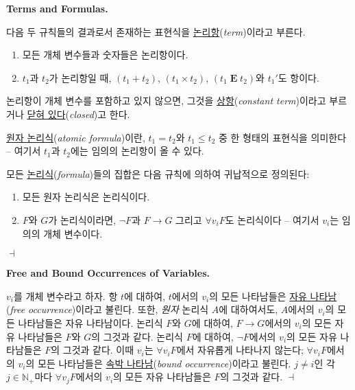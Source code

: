 \documentclass[12pt]{paper}
\newenvironment{context}[1][]
{ \noindent \textbf{{#1}.}
}
{ \hfill $ \dashv $
}
\begin{document}
  \begin{context}[Terms and Formulas]
    다음 두 규칙들의 결과로서 존재하는 표현식을 \underline{논리항}(\textit{term})이라고 부른다.
    \begin{enumerate}
      \item 모든 개체 변수들과 숫자들은 논리항이다.
      \item $t_{1}$과 $t_{2}$가 논리항일 때, $\left( t_{1} + t_{2} \right)$, $\left( t_{1} \times t_{2} \right)$, $\left( t_{1} \mathop{\mathbf{E}} t_{2} \right)$와 $t_{1} '$도 항이다.
    \end{enumerate}

    논리항이 개체 변수를 포함하고 있지 않으면, 그것을 \underline{상항}(\textit{constant term})이라고 부르거나 \underline{닫혀 있다}(\textit{closed})고 한다.

    \underline{원자 논리식}(\textit{atomic formula})이란,
    $t_{1} = t_{2}$와 $t_{1} \leq t_{2}$ 중 한 형태의 표현식을 의미한다 --
    여기서 $t_{1}$과 $t_{2}$에는 임의의 논리항이 올 수 있다.

    모든 \underline{논리식}(\textit{formula})들의 집합은 다음 규칙에 의하여 귀납적으로 정의된다:
    \begin{enumerate}
      \item 모든 원자 논리식은 논리식이다.
      \item $F$와 $G$가 논리식이라면, $\lnot F$과 $F \rightarrow G$ 그리고 $\forall v_{i} F$도 논리식이다 --
      여기서 $v_{i}$는 임의의 개체 변수이다.
    \end{enumerate}
  \end{context}

  \begin{context}[Free and Bound Occurrences of Variables]
    $v_{i}$를 개체 변수라고 하자.
    항 $t$에 대하여, $t$에서의 $v_{i}$의 모든 나타남들은 \underline{자유 나타남}(\textit{free occurrence})이라고 불린다.
    또한, \textit{원자} 논리식 $A$에 대하여서도, $A$에서의 $v_{i}$의 모든 나타남들은 자유 나타남이다.
    논리식 $F$와 $G$에 대하여, $F \rightarrow G$에서의 $v_{i}$의 모든 자유 나타남들은 $F$와 $G$의 그것과 같다.
    논리식 $F$에 대하여, $\lnot F$에서의 $v_{i}$의 모든 자유 나타남들은 $F$의 그것과 같다.
    이때 $v_{i}$는 $\forall v_{i} F$에서 자유롭게 나타나지 않는다;
    $\forall v_{i} F$에서의 $v_{i}$의 모든 나타남들은 \underline{속박 나타남}(\textit{bound occurrence})이라고 불린다.
    $j \neq i$인 각 $j \in \mathbb{N}_{+}$마다 $\forall v_{j} F$에서의 $v_{i}$의 모든 자유 나타남들은 $F$의 그것과 같다.
  \end{context}
\end{document}
